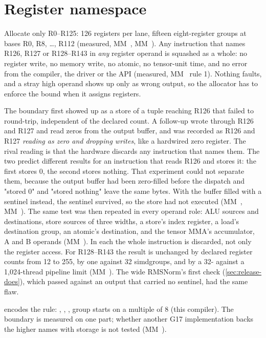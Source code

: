 \section{Register namespace}\label{sec:namespace}

Allocate only R0–R125: 126 registers per lane, fifteen eight-register groups at bases R0, R8, \dots{}, R112
(measured, MM~, MM~). Any instruction that names R126, R127 or R128–R143 in \emph{any} register operand is squashed as a
whole: no register write, no memory write, no atomic, no tensor-unit time, and no error from the compiler, the driver
or the API (measured, MM~ rule 1). Nothing faults, and a stray high operand shows up only as wrong output, so the
allocator has to enforce the bound when it assigns registers.

The boundary first showed up as a store of a tuple reaching R126 that failed to round-trip, independent of the
declared count. A follow-up wrote through R126 and R127 and read zeros from the output buffer, and was recorded as
R126 and R127 \emph{reading as zero and dropping writes}, like a hardwired zero register. The rival reading is that the
hardware discards any instruction that names them. The two predict different results for an instruction that reads
R126 and stores it: the first stores 0, the second stores nothing. That experiment could not separate them, because the
output buffer had been zero-filled before the dispatch and "stored 0" and "stored nothing" leave the same bytes. With
the buffer filled with a sentinel instead, the sentinel survived, so the store had not executed (MM~, MM~).
The same test was then repeated in every operand role: ALU sources and destinations, store sources of three widths, a
store's index register, a load's destination group, an atomic's destination, and the tensor MMA's accumulator, A and B
operands (MM~). In each the whole instruction is discarded, not only the register access. For R128–R143 the result
is unchanged by declared register counts from 12 to 255, by one against 32 simdgroups, and by a 32- against a
1,024-thread pipeline limit (MM~). The wide RMSNorm's first check (\cref{sec:release-does}), which passed against an output that
carried no sentinel, had the same flaw.

 encodes the rule: , ,
, group starts on a multiple of 8 (this compiler). The boundary is measured on
one part; whether another G17 implementation backs the higher names with storage is not tested (MM~).

